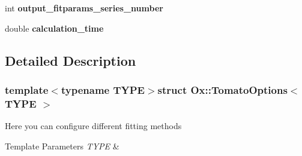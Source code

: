 \begin{DoxyCompactItemize}
\item 
\hypertarget{struct_ox_1_1_tomato_options_a58664e816cde6eff746bd5abe4fe2d1c}{int {\bfseries output\-\_\-fitparams\-\_\-series\-\_\-number}}\label{struct_ox_1_1_tomato_options_a58664e816cde6eff746bd5abe4fe2d1c}

\item 
\hypertarget{struct_ox_1_1_tomato_options_a008c932c7d65248d2d82e0e654993384}{double {\bfseries calculation\-\_\-time}}\label{struct_ox_1_1_tomato_options_a008c932c7d65248d2d82e0e654993384}

\end{DoxyCompactItemize}


\subsection{Detailed Description}
\subsubsection*{template$<$typename T\-Y\-P\-E$>$struct Ox\-::\-Tomato\-Options$<$ T\-Y\-P\-E $>$}

Here you can configure different fitting methods 
\begin{DoxyTemplParams}{Template Parameters}
{\em T\-Y\-P\-E} & \\
\hline
\end{DoxyTemplParams}


